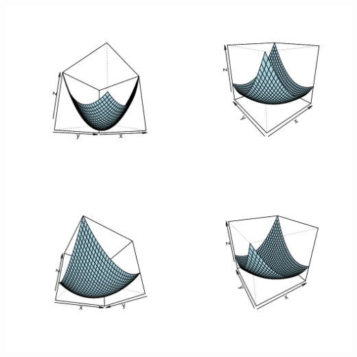 \documentclass[conference,final,11pt,technote,onecolumn]{IEEEtran}\usepackage[]{graphicx}\usepackage[]{color}
\newenvironment{knitrout}{}{} %
\begin{document}
\begin{knitrout}
{\centering \includegraphics[width=6in]{figure/minimal-Plot-surface-1-1} 

}



\end{knitrout}
\end{document}
